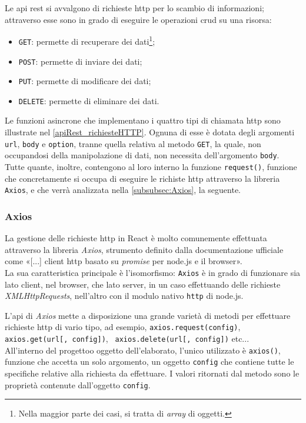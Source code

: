 Le \gls{api} \acrshort{rest} si avvalgono di richieste \gls{http} per lo scambio di informazioni; attraverso esse sono in grado di eseguire le operazioni \acrfull{crud} su una risorsa:
\begin{itemize}
  \item \texttt{GET}: permette di recuperare dei dati\footnote{Nella maggior parte dei casi, si tratta di \textit{array} di oggetti.};
  \item \texttt{POST}: permette di inviare dei dati;
  \item \texttt{PUT}: permette di modificare dei dati;
  \item \texttt{DELETE}: permette di eliminare dei dati.
\end{itemize}
Le funzioni asincrone che implementano i quattro tipi di chiamata \gls{http} sono illustrate nel \autoref{apiRest_richiesteHTTP}. Ognuna di esse è dotata degli argomenti \texttt{url}, \texttt{body} e \texttt{option}, tranne quella relativa al metodo \texttt{GET}, la quale, non occupandosi della manipolazione di dati, non necessita dell'argomento \texttt{body}. Tutte quante, inoltre, contengono al loro interno la funzione \texttt{request()}, funzione che concretamente si occupa di eseguire le richiste \gls{http} attraverso la libreria \texttt{Axios}, e che verrà analizzata nella \autoref{subsubsec:Axios}, la seguente.



\subsubsection{Axios}
\label{subsubsec:Axios}
La gestione delle richieste \gls{http} in React è molto comunemente effettuata attraverso la libreria \textit{Axios}, strumento definito dalla documentazione ufficiale come «[...] client \gls{http} basato su \textit{promise} per node.js e il browser»\cite{Axios_GettingStarted}.\\ La sua caratteristica principale è l'isomorfismo: \texttt{Axios} è in grado di funzionare sia lato client, nel browser, che lato server, in un caso effettuando delle richieste \textit{XMLHttpRequests}, nell'altro con il modulo nativo \texttt{http} di node.js.

L'\gls{api} di \textit{Axios} mette a disposizione una grande varietà di metodi per effettuare richieste \gls{http} di vario tipo, ad esempio, \texttt{axios.request(config)}, \texttt{
axios.get(url[, config])}, \texttt{
axios.delete(url[, config])} etc...\\
All'interno del progettoo oggetto dell'elaborato, l'unico utilizzato è \texttt{axios()}, funzione che accetta un solo argomento, un oggetto \texttt{config} che contiene tutte le specifiche relative alla richiesta da effettuare. I valori ritornati dal metodo sono le proprietà contenute dall'oggetto \texttt{config}.

